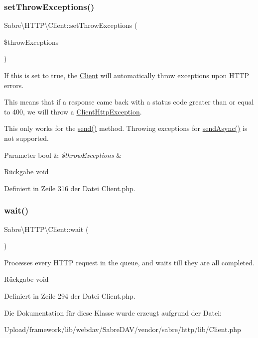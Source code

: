\subsubsection{\texorpdfstring{set\+Throw\+Exceptions()}{setThrowExceptions()}}
{\footnotesize\ttfamily Sabre\textbackslash{}\+H\+T\+T\+P\textbackslash{}\+Client\+::set\+Throw\+Exceptions (\begin{DoxyParamCaption}\item[{}]{\$throw\+Exceptions }\end{DoxyParamCaption})}

If this is set to true, the \mbox{\hyperlink{class_sabre_1_1_h_t_t_p_1_1_client}{Client}} will automatically throw exceptions upon H\+T\+TP errors.

This means that if a response came back with a status code greater than or equal to 400, we will throw a \mbox{\hyperlink{class_sabre_1_1_h_t_t_p_1_1_client_http_exception}{Client\+Http\+Exception}}.

This only works for the \mbox{\hyperlink{class_sabre_1_1_h_t_t_p_1_1_client_a7f3519f925a27ff12cf4bfa2c6980d92}{send()}} method. Throwing exceptions for \mbox{\hyperlink{class_sabre_1_1_h_t_t_p_1_1_client_a25bb46e1543b11f26ef20fc010ea60e2}{send\+Async()}} is not supported.


\begin{DoxyParams}[1]{Parameter}
bool & {\em \$throw\+Exceptions} & \\
\hline
\end{DoxyParams}
\begin{DoxyReturn}{Rückgabe}
void 
\end{DoxyReturn}


Definiert in Zeile 316 der Datei Client.\+php.

\mbox{\label{class_sabre_1_1_h_t_t_p_1_1_client_a7a549abe7af0028a19d47d9bdeaafa7b}} 
\subsubsection{\texorpdfstring{wait()}{wait()}}
{\footnotesize\ttfamily Sabre\textbackslash{}\+H\+T\+T\+P\textbackslash{}\+Client\+::wait (\begin{DoxyParamCaption}{ }\end{DoxyParamCaption})}

Processes every H\+T\+TP request in the queue, and waits till they are all completed.

\begin{DoxyReturn}{Rückgabe}
void 
\end{DoxyReturn}


Definiert in Zeile 294 der Datei Client.\+php.



Die Dokumentation für diese Klasse wurde erzeugt aufgrund der Datei\+:\begin{DoxyCompactItemize}
\item 
Upload/framework/lib/webdav/\+Sabre\+D\+A\+V/vendor/sabre/http/lib/Client.\+php\end{DoxyCompactItemize}
